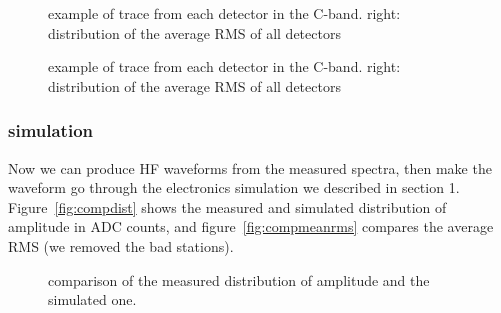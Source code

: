 \begin{figure}[!ht]
  \centering
  \hspace*{-3ex}
  \caption{example of trace from each detector in the C-band. right: distribution of the average RMS of all detectors}
  \label{fig:datatrace}
\end{figure}

\begin{figure}[!ht]
  \centering
  \hspace*{-3ex}
  \caption{example of trace from each detector in the C-band. right: distribution of the average RMS of all detectors}
  \label{fig:datatrace}
\end{figure}

\subsubsection{simulation}
Now we can  produce HF waveforms from the  measured spectra, then make
the  waveform go through  the electronics  simulation we  described in
section 1. Figure~\ref{fig:compdist}  shows the measured and simulated
distribution     of      amplitude     in     ADC      counts,     and
figure~\ref{fig:compmeanrms} compares the  average RMS (we removed the
bad stations).



\begin{figure}[!ht]
  \centering
  \hspace*{-3ex}
  \caption{comparison of the measured distribution of amplitude and the simulated one.}
  \label{fig:datatrace}
\end{figure}

